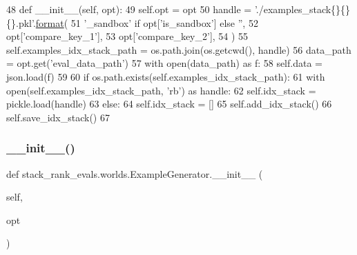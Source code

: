 \begin{DoxyCode}
48     \textcolor{keyword}{def }\_\_init\_\_(self, opt):
49         self.opt = opt
50         handle = \textcolor{stringliteral}{'./examples\_stack\{\}\{\}\{\}.pkl'}.\hyperlink{namespaceparlai_1_1chat__service_1_1services_1_1messenger_1_1shared__utils_a32e2e2022b824fbaf80c747160b52a76}{format}(
51             \textcolor{stringliteral}{'\_sandbox'} \textcolor{keywordflow}{if} opt[\textcolor{stringliteral}{'is\_sandbox'}] \textcolor{keywordflow}{else} \textcolor{stringliteral}{''},
52             opt[\textcolor{stringliteral}{'compare\_key\_1'}],
53             opt[\textcolor{stringliteral}{'compare\_key\_2'}],
54         )
55         self.examples\_idx\_stack\_path = os.path.join(os.getcwd(), handle)
56         data\_path = opt.get(\textcolor{stringliteral}{'eval\_data\_path'})
57         with open(data\_path) \textcolor{keyword}{as} f:
58             self.data = json.load(f)
59 
60         \textcolor{keywordflow}{if} os.path.exists(self.examples\_idx\_stack\_path):
61             with open(self.examples\_idx\_stack\_path, \textcolor{stringliteral}{'rb'}) \textcolor{keyword}{as} handle:
62                 self.idx\_stack = pickle.load(handle)
63         \textcolor{keywordflow}{else}:
64             self.idx\_stack = []
65             self.add\_idx\_stack()
66             self.save\_idx\_stack()
67 
\end{DoxyCode}
\mbox{\label{classstack__rank__evals_1_1worlds_1_1ExampleGenerator_a6b15b72b85a0358bb6c171ef6b183c9d}} 
\subsubsection{\texorpdfstring{\+\_\+\+\_\+init\+\_\+\+\_\+()}{\_\_init\_\_()}\hspace{0.1cm}{\footnotesize\ttfamily [2/2]}}
{\footnotesize\ttfamily def stack\+\_\+rank\+\_\+evals.\+worlds.\+Example\+Generator.\+\_\+\+\_\+init\+\_\+\+\_\+ (\begin{DoxyParamCaption}\item[{}]{self,  }\item[{}]{opt }\end{DoxyParamCaption})}



